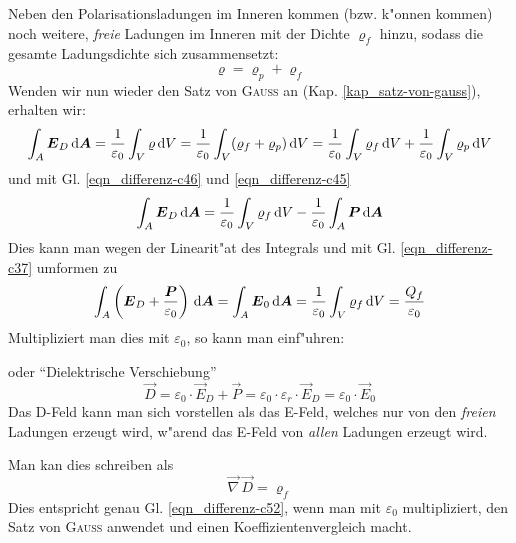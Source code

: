 Neben den Polarisationsladungen im Inneren kommen
(bzw. k"onnen kommen) noch weitere, \emph{freie} Ladungen im Inneren
mit der Dichte $\varrho_f$ hinzu, sodass die gesamte Ladungsdichte
sich zusammensetzt:
\begin{equation}
   \label{eqn_differenz-c48}
   \varrho = \varrho_p + \varrho_f
\end{equation}
Wenden wir nun wieder den Satz von \textsc{Gauss} an
(Kap. \ref{kap_satz-von-gauss}), erhalten wir:
\begin{equation}
   \label{eqn_differenz-c50}
   \int_A \boldsymbol{E}_D \, \mathrm{d} \boldsymbol{A} = \frac{1}{\varepsilon_0} \int_V
   \varrho \, \mathrm{d} V
=
\frac{1}{\varepsilon_0} \int_V (\varrho_f + \varrho_p) \, \mathrm{d} V =
\frac{1}{\varepsilon_0} \int_V \varrho_f\, \mathrm{d} V + \frac{1}{\varepsilon_0} \int_V \varrho_p \, \mathrm{d} V
\end{equation}
und mit Gl. \eqref{eqn_differenz-c46} und \eqref{eqn_differenz-c45}
\begin{equation*}
   \label{eqn_differenz-c51}
     \int_A \boldsymbol{E}_D \, \mathrm{d} \boldsymbol{A}  = \frac{1}{\varepsilon_0} \int_V
     \varrho_f\, \mathrm{d} V  - \frac{1}{\varepsilon_0}\int_A \boldsymbol{P} \, \mathrm{d} \boldsymbol{A}
\end{equation*}
Dies kann man wegen der Linearit"at des Integrals und mit
Gl. \eqref{eqn_differenz-c37} umformen zu
\begin{equation}
   \label{eqn_differenz-c52}
   \int_A \left (\boldsymbol{E}_D + \frac{\boldsymbol{P}}{\varepsilon_0}\right )
   \, \mathrm{d} \boldsymbol{A} = \int_A \boldsymbol{E}_0 \, \mathrm{d} \boldsymbol{A} =
\frac{1}{\varepsilon_0}   \int_V \varrho_f \, \mathrm{d} V = \frac{Q_f}{\varepsilon_0}
\end{equation}
Multipliziert man dies mit $\varepsilon_0$, so kann man einf"uhren:
\begin{Def}
   oder "`Dielektrische Verschiebung"'
   \begin{equation}
      \label{eqn_differenz-c53}
      \boxed{  \vec D = \varepsilon_0 \cdot \vec E_D + \vec P =
        \varepsilon_0 \cdot \varepsilon_r \cdot \vec E_D =
        \varepsilon_0 \cdot \vec E_0  }
   \end{equation}
Das D-Feld kann man sich vorstellen als das E-Feld, welches nur von
den \emph{freien} Ladungen erzeugt wird, w"arend das E-Feld von
\emph{allen} Ladungen erzeugt wird.
\end{Def}
Man kan dies schreiben als
\begin{equation}
   \label{eqn_differenz-c55}
   \vec \nabla \, \vec D = \varrho_f
\end{equation}
Dies entspricht genau Gl. \eqref{eqn_differenz-c52}, wenn man mit $\varepsilon_0$
multipliziert, den Satz von \textsc{Gauss} anwendet und einen
Koeffizientenvergleich macht.

